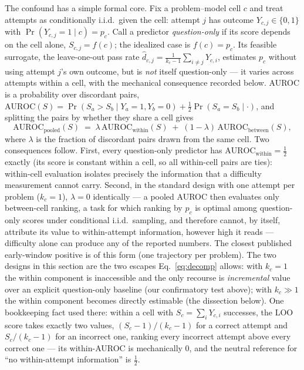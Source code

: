 The confound has a simple formal core. Fix a problem--model cell $c$ and
treat attempts as conditionally i.i.d.\ given the cell: attempt $j$ has
outcome $Y_{c,j} \in \{0,1\}$ with $\Pr(Y_{c,j} = 1 \mid c) = p_c$. Call
a predictor \emph{question-only} if its score depends on the cell alone,
$S_{c,j} = f(c)$; the idealized case is $f(c) = p_c$. Its feasible
surrogate, the leave-one-out pass rate
$\hat d_{c,j} = \frac{1}{k_c - 1} \sum_{i \ne j} Y_{c,i}$, estimates
$p_c$ without using attempt $j$'s own outcome, but is \emph{not} itself
question-only --- it varies across attempts within a cell, with the
mechanical consequence recorded below. AUROC is a probability over discordant pairs,
$\mathrm{AUROC}(S) = \Pr(S_a > S_b \mid Y_a = 1, Y_b = 0) + \tfrac{1}{2}
\Pr(S_a = S_b \mid \cdot)$, and splitting the pairs by whether they share
a cell gives
\begin{equation}
\mathrm{AUROC}_{\mathrm{pooled}}(S) \;=\; \lambda \,
\mathrm{AUROC}_{\mathrm{within}}(S) \;+\; (1 - \lambda)\,
\mathrm{AUROC}_{\mathrm{between}}(S),
\label{eq:decomp}
\end{equation}
where $\lambda$ is the fraction of discordant pairs drawn from the same
cell. Two consequences follow. First, every question-only predictor has
$\mathrm{AUROC}_{\mathrm{within}} = \tfrac{1}{2}$ exactly (its score is
constant within a cell, so all within-cell pairs are ties): within-cell
evaluation isolates precisely the information that a difficulty
measurement cannot carry. Second, in the standard design with one attempt
per problem ($k_c = 1$), $\lambda = 0$ identically --- a pooled AUROC then
evaluates only between-cell ranking, a task for which ranking by $p_c$ is
optimal among question-only scores under conditional i.i.d.\ sampling,
and therefore cannot, by itself, attribute its value to within-attempt
information, however high it reads --- difficulty alone can produce any of
the reported numbers. The closest published early-window positive
\citep{david2025temporal} is of this form (one trajectory per problem). The two
designs in this section are the two escapes Eq.~\eqref{eq:decomp} allows:
with $k_c = 1$ the within component is inaccessible and the only recourse
is \emph{incremental} value over an explicit question-only baseline (our
confirmatory test above); with $k_c \gg 1$ the within component becomes
directly estimable (the dissection below). One bookkeeping fact used
there: within a cell with $S_c = \sum_i Y_{c,i}$ successes, the LOO score
takes exactly two values, $(S_c - 1)/(k_c - 1)$ for a correct attempt and
$S_c/(k_c - 1)$ for an incorrect one, ranking every incorrect attempt
above every correct one --- its within-AUROC is mechanically $0$, and the
neutral reference for ``no within-attempt information'' is $\tfrac{1}{2}$.

